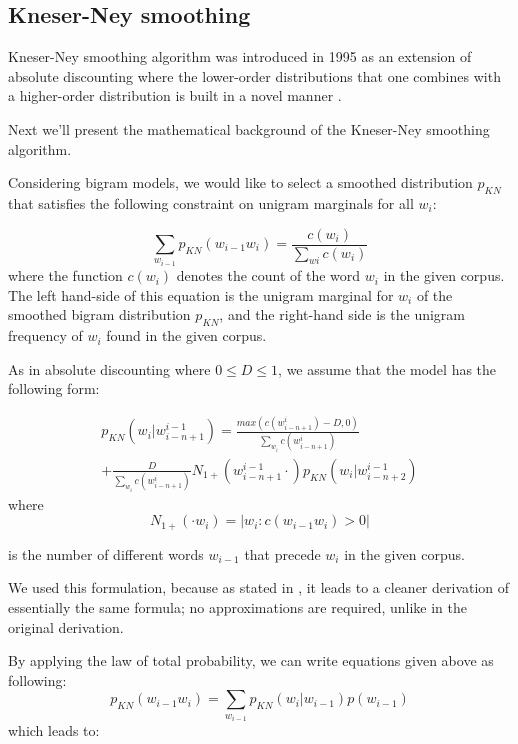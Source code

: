 \documentclass[10pt, a4paper]{article}
\begin{document}
\subsection{Kneser-Ney smoothing}
Kneser-Ney smoothing algorithm was introduced in 1995 as an extension of absolute discounting where the lower-order distributions that one combines with a higher-order distribution is built in a novel manner \cite{1_chen1999empirical}. 

Next we\rq{}ll present the mathematical background of the Kneser-Ney smoothing algorithm.

Considering bigram models, we would like to select a smoothed distribution $p_{KN}$ that satisfies the following constraint on unigram marginals for all $w_i$:

\begin{equation}
\sum_{w_{i - 1}} p_{KN}(w_{i-1}w_{i} ) = \frac{c(w_{i})}{\sum_{w{i}} c(w_{i})}
\end{equation}
where the function $c(w_{i})$ denotes the count of the word $w_{i}$ in the given corpus. The left hand-side of this equation is the unigram marginal for $w_{i}$ of the smoothed bigram distribution $p_{KN}$, and the right-hand side is the unigram frequency of $w_{i}$ found in the given corpus.

As in absolute discounting where $0 \le D \le 1$, we assume that the model has the following form:

\begin{multline}
p_{KN}(w_{i} | w_{i-n+1}^{i-1}) = \frac{max(c(w_{i-n+1}^{i}) - D, 0)}{\sum_{w_{i}} c(w_{i-n+1}^{i})}  \\ + \frac{D}{\sum_{w_{i}} c(w_{i-n+1}^{i})} N_{1+}(w_{i-n+1}^{i-1} \cdot) p_{KN}(w_{i} | w_{i-n+2}^{i-1}) 
\end{multline}
where 
\begin{equation}
N_{1+}(\cdot w_{i}) = |{w_{i} : c(w_{i-1}w_{i}) > 0}|
\end{equation}

is the number of different words $w_{i-1}$ that precede $w_{i}$ in the given corpus.

We used this formulation, because as stated in \cite{1_chen1999empirical}, it leads to a cleaner derivation of essentially the same formula; no approximations are required, unlike in the original derivation.

By applying the law of total probability, we can write equations given above as following:
\begin{equation}
p_{KN}(w_{i-1}w_{i} ) = \sum_{w_{i-1}} p_{KN}(w_{i} | w_{i-1} )p(w_{i-1})
\end{equation}
which leads to:
\end{document}
